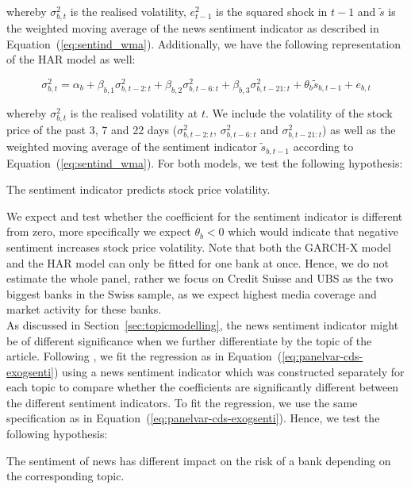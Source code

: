 whereby $\sigma^2_{b,t}$ is the realised volatility, $e^2_{t-1}$ is the squared shock in $t-1$ and $\tilde{s}$ is the weighted moving average of the news sentiment indicator as described in \mbox{Equation~(\ref{eq:sentind_wma})}. Additionally, we have the following representation of the HAR model as well:

\begin{equation}
	\sigma^2_{b,t} = \alpha_b + \beta_{b,1}\sigma^2_{b,t-2:t} + \beta_{b,2}\sigma^2_{b,t-6:t} + \beta_{b,3}\sigma^2_{b,t-21:t} + \theta_b \tilde{s}_{b,t-1} + e_{b,t}
\end{equation}

whereby $\sigma^2_{b,t}$ is the realised volatility at $t$. We include the volatility of the stock price of the past 3, 7 and 22 days ($\sigma^2_{b,t-2:t}$, $\sigma^2_{b,t-6:t}$ and $\sigma^2_{b,t-21:t}$) as well as the weighted moving average of the sentiment indicator $\tilde{s}_{b,t-1}$ according to \mbox{Equation~(\ref{eq:sentind_wma})}. For both models, we test the following hypothesis:

\begin{hyp}
	The sentiment indicator predicts stock price volatility.
\end{hyp} 

We expect and test whether the coefficient for the sentiment indicator is different from zero, more specifically we expect $\theta_b<0$ which would indicate that negative sentiment increases stock price volatility. Note that both the GARCH-X model and the HAR model can only be fitted for one bank at once. Hence, we do not estimate the whole panel, rather we focus on Credit Suisse and UBS as the two biggest banks in the Swiss sample, as we expect highest media coverage and market activity for these banks. \\

As discussed in \mbox{Section~\ref{sec:topicmodelling}}, the news sentiment indicator might be of different significance when we further differentiate by the topic of the article. Following \cite{roeder2020}, we fit the regression as in \mbox{Equation~(\ref{eq:panelvar-cds-exogsenti})} using a news sentiment indicator which was constructed separately for each topic to compare whether the coefficients are significantly different between the different sentiment indicators. To fit the regression, we use the same specification as in \mbox{Equation~(\ref{eq:panelvar-cds-exogsenti})}. Hence, we test the following hypothesis:

\begin{hyp}
	The sentiment of news has different impact on the risk of a bank depending on the corresponding topic.
\end{hyp}


